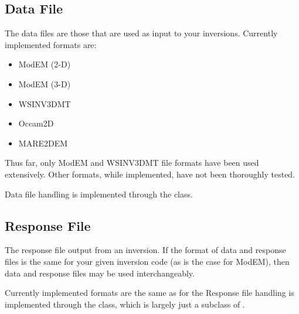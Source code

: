 \documentclass[letterpaper,10pt,english]{sphinxmanual}
\begin{document}
\begin{sphinxVerbatim}[commandchars=\\\{\}]
    
\end{sphinxVerbatim}


\subsection{Data File}
\label{\detokenize{content/api_core/input_files:data-file}}\label{\detokenize{content/api_core/input_files:id2}}
The data files are those that are used as input to your inversions.
Currently implemented formats are:
\begin{itemize}
\item {} 
ModEM (2-D)

\item {} 
ModEM (3-D)

\item {} 
WSINV3DMT

\item {} 
Occam2D

\item {} 
MARE2DEM

\end{itemize}

Thus far, only ModEM and WSINV3DMT file formats have been used extensively. Other formats, while implemented, have not been thoroughly tested.

Data file handling is implemented through the {\hyperref[\detokenize{content/api_core/data_structures:data}]{}} class.


\subsection{Response File}
\label{\detokenize{content/api_core/input_files:response-file}}\label{\detokenize{content/api_core/input_files:id3}}
The response file output from an inversion. If the format of data and response files is the same for your given inversion code (as is the case for ModEM), then data and response files may be used interchangeably.

Currently implemented formats are the same as for the {\hyperref[\detokenize{content/api_core/input_files:data-file}]{}}
Response file handling is implemented through the {\hyperref[\detokenize{content/api_core/data_structures:response}]{}} class, which is largely just a subclass of {\hyperref[\detokenize{content/api_core/data_structures:data}]{}}.
\end{document}
